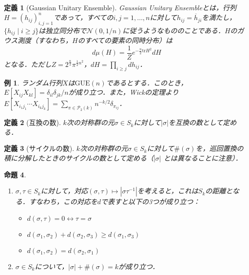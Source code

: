 \documentclass{ltjsarticle}
\theoremstyle{mystyle1}
\newtheorem{dfn}{定義}[section]
\newtheorem{prop}[dfn]{命題}
\theoremstyle{mystyle2}
\newtheorem{example}{例}
\theoremstyle{mystyle3}
\begin{document}
\begin{dfn}[Gaussian Unitary Ensemble]
    Gaussian Unitary Ensembleとは，行列$H=(h_{ij})_{i,j=1}^n$であって，すべての$i,j=1,\ldots,n$に対して$h_{ij}=\overline{h}_{ji}$を満たし，$\{h_{ij}\mid i\geq j\}$は独立同分布で$\mathcal{N}(0,1/n)$に従うようなもののことである．$H$のガウス測度（すなわち，$H$のすべての要素の同時分布）は
    \begin{equation}
        d\mu(H)=\frac{1}{Z}e^{-\frac{n}{2}\mathrm{tr}H^2}dH
    \end{equation}
    となる．ただし$Z=2^{\frac{n}{2}}\pi^{\frac{1}{2}n^2}$，$dH=\prod_{i\geq j}dh_{ij}$．
\end{dfn}

\begin{example}
    ランダム行列$X$は$\mathrm{GUE}(n)$であるとする．このとき，$E[X_{ij}X_{kl}]=\delta_{il}\delta_{jk}/n$が成り立つ．また，Wickの定理より$E[X_{i_1j_1}\cdots X_{i_kj_k}]=\sum_{\pi\in\mathcal{P}_2(k)}n^{-k/2}\delta_{\pi_{ij}}$．
\end{example}

\begin{dfn}[互換の数]
    $k$次の対称群の元$\sigma\in S_k$に対して$|\sigma|$を互換の数として定める．
\end{dfn}

\begin{dfn}[サイクルの数]
    $k$次の対称群の元$\sigma\in S_k$に対して$\#(\sigma)$を，巡回置換の積に分解したときのサイクルの数として定める（$|\sigma|$ とは異なることに注意）．
\end{dfn}

\begin{prop}
    \
    \begin{enumerate}
        \item $\sigma,\tau \in S_k$に対して，対応$(\sigma,\tau)\mapsto |\sigma\tau^{-1}|$を考えると，これは$S_k$の距離となる．すなわち，この対応を$d$で表すと以下の3つが成り立つ：
              \begin{itemize}
                  \item $d(\sigma,\tau)=0\leftrightarrow \tau=\sigma$
                  \item $d(\sigma_1,\sigma_2)+d(\sigma_2,\sigma_3)\geq d(\sigma_1,\sigma_3)$
                  \item $d(\sigma_1,\sigma_2)=d(\sigma_2,\sigma_1)$
              \end{itemize}
        \item $\sigma\in S_k$について，$|\sigma|+\#(\sigma)=k$が成り立つ．
    \end{enumerate}
\end{prop}
\end{document}
